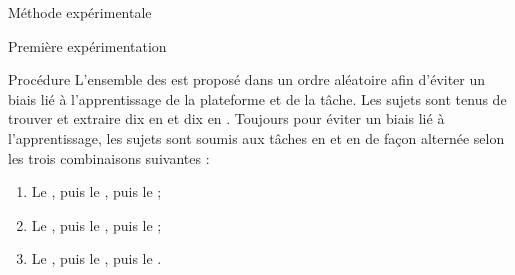\documentclass[myfrancais,ngerman,english,french]{mythesis}
\begin{document}
\begin{mychapter}{Méthode expérimentale}
\begin{mysection}{Première expérimentation}
\begin{mysubsection}{Procédure}
				L'ensemble des  est proposé dans un ordre aléatoire afin d'éviter un biais lié à l'apprentissage de la plateforme et de la tâche.
				Les sujets sont tenus de trouver et extraire dix  en  et dix  en .
				Toujours pour éviter un biais lié à l'apprentissage, les sujets sont soumis aux tâches en  et en  de façon alternée selon les trois combinaisons suivantes :
				\begin{enumerate}
					\item Le  , puis le  , puis le  ;
					\item Le  , puis le  , puis le  ;
					\item Le  , puis le  , puis le  .
				\end{enumerate}


\end{mysubsection}
\end{mysection}
\end{mychapter}
\end{document}
